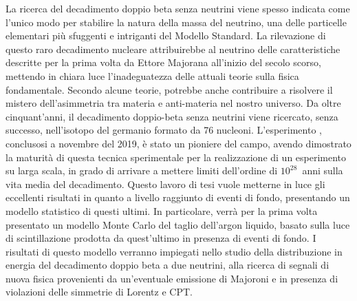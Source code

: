 
La ricerca del decadimento doppio beta senza neutrini viene spesso indicata come l'unico
modo per stabilire la natura della massa del neutrino, una delle particelle elementari
più sfuggenti e intriganti del Modello Standard. La rilevazione di questo raro
decadimento nucleare attribuirebbe al neutrino delle caratteristiche descritte per la
prima volta da Ettore Majorana all'inizio del secolo scorso, mettendo in chiara luce
l'inadeguatezza delle attuali teorie sulla fisica fondamentale. Secondo alcune teorie,
potrebbe anche contribuire a risolvere il mistero dell'asimmetria tra materia e
anti-materia nel nostro universo. Da oltre cinquant'anni, il decadimento doppio-beta senza
neutrini viene ricercato, senza successo, nell'isotopo del germanio formato da 76
nucleoni. L'esperimento \gerda, conclusosi a novembre del 2019, è stato un pioniere del
campo, avendo dimostrato la maturità di questa tecnica sperimentale per la realizzazione
di un esperimento su larga scala, in grado di arrivare a mettere limiti dell'ordine di
$10^{28}$~anni sulla vita media del decadimento. Questo lavoro di tesi vuole metterne in
luce gli eccellenti risultati in quanto a livello raggiunto di eventi di fondo,
presentando un modello statistico di questi ultimi. In particolare, verrà per la prima
volta presentato un modello Monte Carlo del taglio dell'argon liquido, basato sulla luce
di scintillazione prodotta da quest'ultimo in presenza di eventi di fondo. I risultati di
questo modello verranno impiegati nello studio della distribuzione in energia del
decadimento doppio beta a due neutrini, alla ricerca di segnali di nuova fisica
provenienti da un'eventuale emissione di Majoroni e in presenza di violazioni delle
simmetrie di Lorentz e CPT. 

